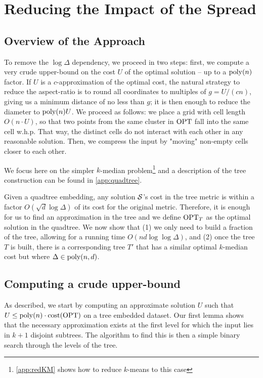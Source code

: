 \section{Reducing the Impact of the Spread}
\label{sec:logdelta}
\newcommand{\boxsize}{\textsc{MaxDist}}

\subsection{Overview of the Approach}
To remove the $\log\Delta$ dependency, we proceed in two steps: first, we compute a very crude upper-bound on the cost $U$ of the optimal
solution -- up to a $\operatorname{poly}(n)$ factor.  If $U$ is a $c$-approximation of the optimal cost, the natural strategy to reduce the aspect-ratio is to round all
coordinates to multiples of $g = U/(cn)$, giving us a minimum distance of no less than $g$; it is then enough to reduce the diameter to $\operatorname{poly}(n) U$. We proceed as
follows: we place a grid with cell length $O(n \cdot U)$, so that two points from the same cluster in $\text{OPT}$ fall into the same cell w.h.p. That way, the
distinct cells do not interact with each other in any reasonable solution.  Then, we compress the input by "moving" non-empty cells closer to each other.

We focus here on the simpler $k$-median problem\footnote{\cref{app:redKM} shows how to reduce $k$-means to this case} and a description of the tree
construction can be found in \cref{app:quadtree}.

Given a quadtree embedding, any solution $\mathcal S$'s cost in the tree metric is within a factor $O(\sqrt d \log \Delta)$ of its cost for the original metric.
Therefore, it is enough for us to find an approximation in the tree and we define $\text{OPT}_T$ as the optimal solution in the quadtree.  We now show that (1) we
only need to build a fraction of the tree, allowing for a running time $O(nd \log \log \Delta)$, and (2) once the tree $T$ is built, there is a corresponding
tree $T'$ that has a similar optimal $k$-median cost but where $\Delta \in \operatorname{poly}(n, d)$.

\subsection{Computing a crude upper-bound}

As described, we start by computing an approximate solution $U$ such that $U \leq \operatorname{poly}(n) \cdot \operatorname{cost}(\text{OPT})$ on a tree embedded dataset.  Our first lemma shows
that the necessary approximation exists at the first level for which the input lies in $k+1$ disjoint subtrees. The algorithm to find this is then a simple binary
search through the levels of the tree.

